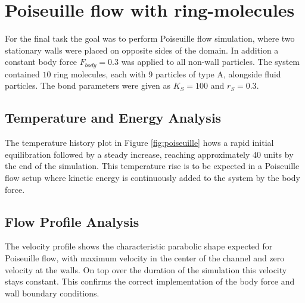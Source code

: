 \section{Poiseuille flow with ring-molecules}
For the final task the goal was to perform Poiseuille flow simulation, where two stationary walls were placed on opposite sides of the domain. In addition a constant body force $F_{body} = 0.3$ was applied to all non-wall particles. The system contained $10$ ring molecules, each with 9 particles of type A, alongside fluid particles. The bond parameters were given as $K_S = 100$ and $r_S = 0.3$.

\subsection{Temperature and Energy Analysis}
The temperature history plot in Figure \ref{fig:poiseuille} hows a rapid initial equilibration followed by a steady increase, reaching approximately 40 units by the end of the simulation. This temperature rise is to be expected in a Poiseuille flow setup where kinetic energy is continuously added to the system by the body force.

\subsection{Flow Profile Analysis}
The velocity profile shows the characteristic parabolic shape expected for Poiseuille flow, with maximum velocity in the center of the channel and zero velocity at the walls. On top over the duration of the simulation this velocity stays constant. This confirms the correct implementation of the body force and wall boundary conditions.


